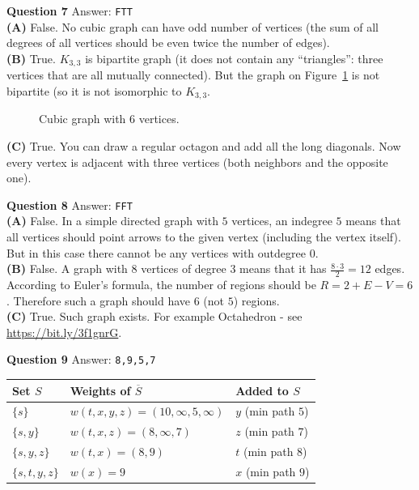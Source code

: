 \documentclass[jou]{apa6}
\begin{document}
\vspace{10pt}
{\bf Question 7} Answer: {\tt FTT}\\
{\bf (A)} False. No cubic graph can have odd number of vertices 
(the sum of all degrees of all vertices should be even \textendash{} twice the number of edges).\\
{\bf (B)} True. $K_{3,3}$ is bipartite graph (it does not contain any ``triangles'': three vertices
that are all mutually connected). But the graph on Figure~\ref{fig:cubic-graph-6}
is not bipartite (so it is not isomorphic
to $K_{3,3}$.

\begin{figure}[!htb]
\caption{\label{fig:cubic-graph-6} Cubic graph with 6 vertices.}
\end{figure}

{\bf (C)} True. You can draw a regular octagon and add all the long diagonals. 
Now every vertex is adjacent with three vertices (both neighbors and the opposite one). 


\vspace{10pt}
{\bf Question 8} Answer: {\tt FFT}\\
{\bf (A)} False. In a simple directed graph with $5$ vertices, an indegree 
$5$ means that all vertices should point arrows to the given vertex (including the vertex itself). 
But in this case there cannot be any vertices with outdegree $0$.\\
{\bf (B)} False. A graph with $8$ vertices of degree $3$ means that it has $\frac{8 \cdot 3}{2} = 12$ edges. 
According to Euler's formula, the number of regions should be $R = 2 + E - V = 6$. Therefore 
such a graph should have $6$ (not $5$) regions.\\
{\bf (C)} True. Such graph exists. For example Octahedron - see \url{https://bit.ly/3f1gnrG}.



\vspace{10pt}
{\bf Question 9} Answer: {\tt 8,9,5,7}

{\footnotesize
\begin{tabular}{|l|l|l|} \hline
Set $S$ & Weights of $\overline{S}$ & Added to $S$ \\ \hline
$\{ s \}$ & $w(t,x,y,z) = (10,\infty,5,\infty)$ & $y$ (min path $5$) \\  \hline
$\{ s,y \}$ & $w(t,x,z) = (8,\infty,7)$ & $z$ (min path $7$) \\ \hline
$\{ s,y,z \}$ & $w(t,x) = (8,9)$ & $t$ (min path $8$) \\ \hline
$\{ s,t,y,z \}$ & $w(x) = 9$ & $x$ (min path $9$) \\ \hline
\end{tabular}
}
\end{document}
